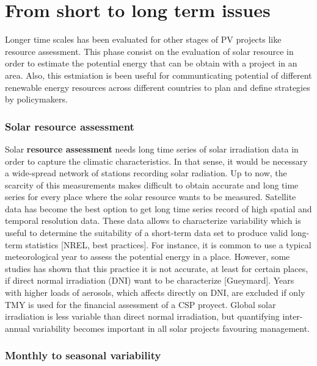 \section{From short to long term issues}

Longer time scales has been evaluated for other stages of PV projects like resource assessment. This phase consist on the evaluation of solar resource in order to estimate the potential energy that can be obtain with a project in an area. Also, this estmiation is been useful for communticating potential of different renewable energy resources across different countries to plan and define strategies by policymakers.

\subsubsection{Solar resource assessment}

Solar \textbf{resource assessment} needs long time series of solar irradiation data in order to capture the climatic characteristics. In that sense, it would be necessary a wide-spread network of stations recording solar radiation. Up to now, the scarcity of this measurements makes difficult to obtain accurate and long time series for every place where the solar resource wants to be measured. Satellite data has become the best option to get long time series record of high spatial and temporal resolution data. These data allows to characterize variability which is useful to determine the suitability of a short-term data set to produce valid long-term statistics [NREL, best practices]. For instance, it is common to use a typical meteorological year to assess the potential energy in a place. However, some studies has shown that this practice it is not accurate, at least for certain places, if direct normal irradiation (DNI) want to be characterize [Gueymard]. Years with higher loads of aerosols, which affects directly on DNI, are excluded if only TMY is used for the financial assessment of a CSP proyect. Global solar irradiation is less variable than direct normal irradiation, but quantifying inter-annual variability becomes important in all solar projects favouring management.


\subsubsection{Monthly to seasonal variability}

